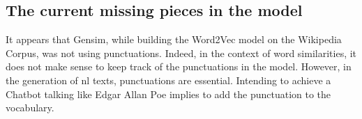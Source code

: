 \subsection{The current missing pieces in the model}
It appears that Gensim, while building the Word2Vec model on the Wikipedia Corpus, was not using punctuations. Indeed, in the context of word similarities, it does not make sense to keep track of the punctuations in the model. However, in the generation of \gls{nl} texts, punctuations are essential. Intending to achieve a Chatbot talking like Edgar Allan Poe implies to add the punctuation to the vocabulary.
